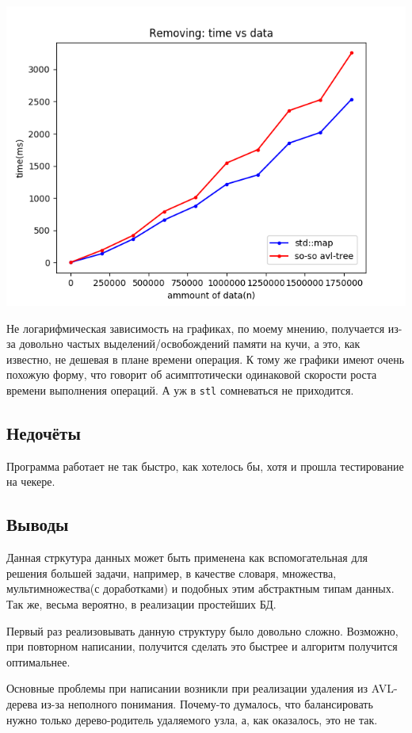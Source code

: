\documentclass[12pt]{article}
\begin{document}
	\begin{center}
		\includegraphics[width=\linewidth]{remove.png}
	\end{center}
	
	Не логарифмическая зависимость на графиках, по моему мнению, получается из-за довольно частых выделений/освобождений памяти на кучи, а это, как известно, не дешевая в плане времени операция.
	К тому же графики имеют очень похожую форму, что говорит об асимптотически одинаковой скорости роста времени выполнения операций. А уж в \verb|stl| сомневаться не приходится.
	
	\subsection*{Недочёты}
	
	Программа работает не так быстро, как хотелось бы, хотя и прошла тестирование на чекере.
	
	\subsection*{Выводы}
	
	Данная стркутура данных может быть применена как вспомогательная для решения большей задачи, например, в качестве словаря, множества, мультимножества(с доработками) и подобных этим абстрактным типам данных. Так же, весьма вероятно, в реализации простейших БД.
	
	Первый раз реализовывать данную структуру было довольно сложно. Возможно, при повторном написании, получится сделать это быстрее и алгоритм получится оптимальнее.
	
	Основные проблемы при написании возникли при реализации удаления из AVL-дерева из-за неполного понимания. Почему-то думалось, что балансировать нужно только дерево-родитель удаляемого узла, а, как оказалось, это не так. 
	
\end{document}
